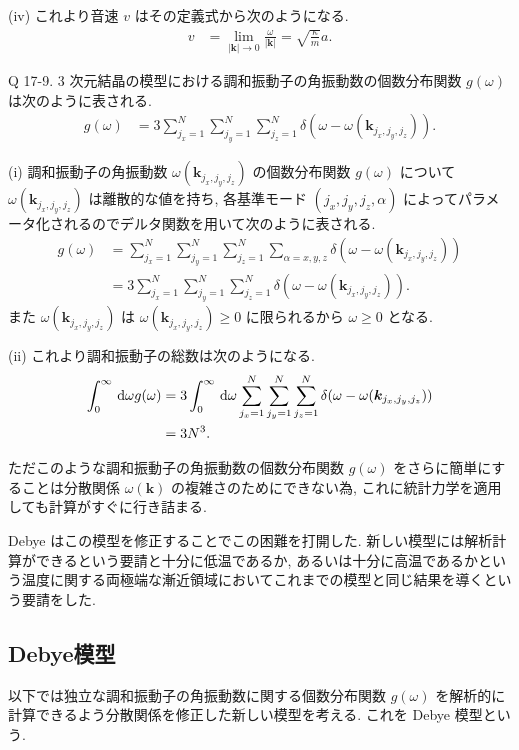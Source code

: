 \documentclass[uplatex,diffipdfmx,a4paper,11pt]{jlreq}
\theoremstyle{definition}
\begin{document}
(iv) これより音速 $v$ はその定義式から次のようになる.
\begin{align}
  v & = \lim_{|\bm{k}|\to 0}\frac{\omega}{|\bm{k}|} = \sqrt{\frac{\kappa}{m}}a.
\end{align}

\begin{itembox}[l]{Q 17-9.}
  3 次元結晶の模型における調和振動子の角振動数の個数分布関数 $g(\omega)$ は次のように表される.
  \begin{align}
    g(\omega) & = 3\sum_{j_x=1}^{N}\sum_{j_y=1}^{N}\sum_{j_z=1}^{N}\delta(\omega - \omega(\bm{k}_{j_x,j_y,j_z})).
  \end{align}
\end{itembox}

(i) 調和振動子の角振動数 $\omega(\bm{k}_{j_x, j_y, j_z})$ の個数分布関数 $g(\omega)$ について $\omega(\bm{k}_{j_x, j_y, j_z})$ は離散的な値を持ち, 各基準モード $(j_x, j_y, j_z, \alpha)$ によってパラメータ化されるのでデルタ関数を用いて次のように表される.
\begin{align}
  g(\omega) & = \sum_{j_x=1}^{N}\sum_{j_y=1}^{N}\sum_{j_z=1}^{N}\sum_{\alpha=x,y,z}\delta(\omega - \omega(\bm{k}_{j_x,j_y,j_z})) \\
            & = 3\sum_{j_x=1}^{N}\sum_{j_y=1}^{N}\sum_{j_z=1}^{N}\delta(\omega - \omega(\bm{k}_{j_x,j_y,j_z})).
\end{align}
また $\omega(\bm{k}_{j_x,j_y,j_z})$ は $\omega(\bm{k}_{j_x,j_y,j_z})\geq 0$ に限られるから $\omega\geq 0$ となる.

(ii) これより調和振動子の総数は次のようになる.
\begin{align}
  \int_0^\infty\dl{\omega}g(\omega) & = 3\int_0^\infty\dl{\omega}\sum_{j_x=1}^{N}\sum_{j_y=1}^{N}\sum_{j_z=1}^{N}\delta(\omega - \omega(\bm{k}_{j_x,j_y,j_z})) \\
                                    & = 3N^3.
\end{align}

ただこのような調和振動子の角振動数の個数分布関数 $g(\omega)$ をさらに簡単にすることは分散関係 $\omega(\bm{k})$ の複雑さのためにできない為, これに統計力学を適用しても計算がすぐに行き詰まる.

Debye はこの模型を修正することでこの困難を打開した. 新しい模型には解析計算ができるという要請と十分に低温であるか, あるいは十分に高温であるかという温度に関する両極端な漸近領域においてこれまでの模型と同じ結果を導くという要請をした.

\subsection{Debye模型}
以下では独立な調和振動子の角振動数に関する個数分布関数 $g(\omega)$ を解析的に計算できるよう分散関係を修正した新しい模型を考える. これを Debye 模型という.
\end{document}
